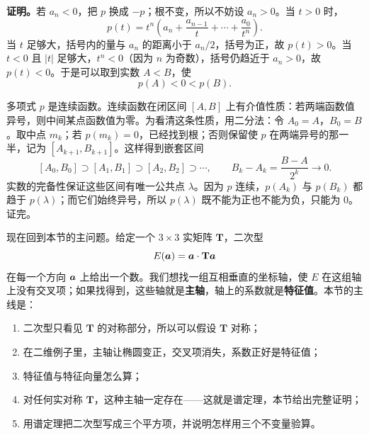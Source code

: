 \documentclass[11pt]{ctexart}
\newcommand{\ten}[1]{\mathbf{#1}}
\let\orighdr\hdr
\renewcommand{\hdr}[2]{\par\needspace{10\baselineskip}\orighdr{#1}{#2}}
\begin{document}
\textbf{证明。}若 $a_n<0$，把 $p$ 换成 $-p$；根不变，所以不妨设 $a_n>0$。当 $t>0$ 时，
\[
p(t)=t^n\left(a_n+\frac{a_{n-1}}{t}+\cdots+\frac{a_0}{t^n}\right).
\]
当 $t$ 足够大，括号内的量与 $a_n$ 的距离小于 $a_n/2$，括号为正，故 $p(t)>0$。当 $t<0$ 且 $|t|$ 足够大，$t^n<0$（因为 $n$ 为奇数），括号仍趋近于 $a_n>0$，故 $p(t)<0$。于是可以取到实数 $A<B$，使
\[
p(A)<0<p(B).
\]

多项式 $p$ 是连续函数。连续函数在闭区间 $[A,B]$ 上有介值性质：若两端函数值异号，则中间某点函数值为零。为看清这条性质，用二分法：令 $A_0=A$，$B_0=B$。取中点 $m_k$；若 $p(m_k)=0$，已经找到根；否则保留使 $p$ 在两端异号的那一半，记为 $[A_{k+1},B_{k+1}]$。这样得到嵌套区间
\[
[A_0,B_0]\supset[A_1,B_1]\supset[A_2,B_2]\supset\cdots,
\qquad
B_k-A_k=\frac{B-A}{2^k}\to0 .
\]
实数的完备性保证这些区间有唯一公共点 $\lambda$。因为 $p$ 连续，$p(A_k)$ 与 $p(B_k)$ 都趋于 $p(\lambda)$；而它们始终异号，所以 $p(\lambda)$ 既不能为正也不能为负，只能为 $0$。证完。

\begin{center}
\end{center}

\label{sec:quadratic}

现在回到本节的主问题。给定一个 $3\times3$ 实矩阵 $\ten T$，二次型
\[
E(\vect a)=\vect a\cdot\ten T\vect a
\]
在每一个方向 $\boldsymbol{a}$ 上给出一个数。我们想找一组互相垂直的坐标轴，使 $E$ 在这组轴上没有交叉项；如果找得到，这些轴就是\textbf{主轴}，轴上的系数就是\textbf{特征值}。本节的主线是：
\begin{enumerate}[label=\arabic*.,leftmargin=1.8em,itemsep=2pt]
\item 二次型只看见 $\ten T$ 的对称部分，所以可以假设 $\ten T$ 对称；
\item 在二维例子里，主轴让椭圆变正，交叉项消失，系数正好是特征值；
\item 特征值与特征向量怎么算；
\item 对任何实对称 $\ten T$，这种主轴一定存在——这就是谱定理，本节给出完整证明；
\item 用谱定理把二次型写成三个平方项，并说明怎样用三个不变量验算。
\end{enumerate}
\end{document}
